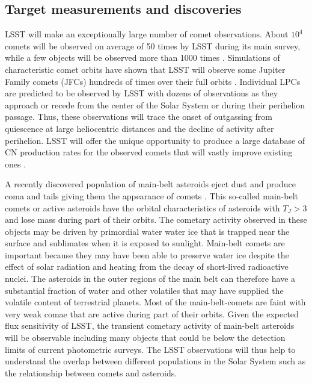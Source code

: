 
\subsection{Target measurements and discoveries}
\label{sec:\secname:targets}

LSST will make an exceptionally large number of comet
observations.  About $10^4$ comets will be observed on average
of 50 times by LSST during its main survey, while a few objects
will be observed more than 1000 times
\citep{2010PhDT.......241S}.  Simulations of characteristic
comet orbits have shown that LSST will observe some Jupiter
Family comets (JFCs) hundreds of times over their full orbits
\citep{2010PhDT.......241S}.  Individual LPCs are predicted to
be observed by LSST with dozens of observations as they
approach or recede from the center of the Solar System or
during their perihelion passage.  Thus, these observations
will trace the onset of outgassing from quiescence at large
heliocentric distances and the decline of activity after
perihelion.  LSST will offer the unique opportunity to produce
a large database of CN production rates for the observed
comets that will vastly improve existing ones \citep[see
e.g.][]{1995Icar..118..223A,2012ApJ...758...29A}.

A recently discovered population of main-belt asteroids eject
dust and produce coma and tails giving them the appearance of
comets \citep{2012AJ....143...66J}.  This so-called main-belt
comets or active asteroids have the orbital characteristics of
asteroids with $T_J > 3$ and lose mass during part of their
orbits. The cometary activity observed in these objects may be
driven by primordial water water ice that is trapped near the
surface and sublimates when it is exposed to sunlight.
Main-belt comets are important because they may have been able to
preserve water ice despite the effect of solar radiation and
heating from the decay of short-lived radioactive nuclei.  The
asteroids in the outer regions of the main belt can therefore
have a substantial fraction of water and other volatiles that
may have supplied the volatile content of terrestrial planets.
Most of the main-belt-comets are faint with very weak comae
that are active during part of their orbits. Given the
expected flux sensitivity of LSST, the transient cometary
activity of main-belt asteroids will be observable including
many objects that could be below the detection limits of
current photometric surveys.  The LSST observations will thus
help to understand the overlap between different populations
in the Solar System such as the relationship between comets
and asteroids.

